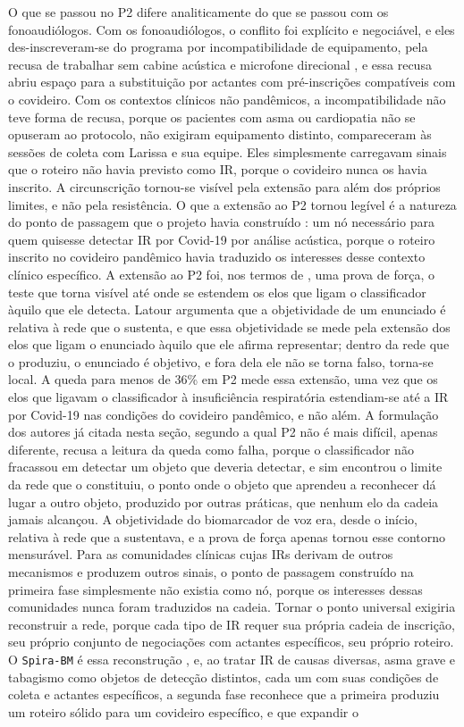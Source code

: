 O que se passou no P2 difere analiticamente do que se passou com os fonoaudiólogos. Com os fonoaudiólogos, o conflito foi explícito e negociável, e eles des-inscreveram-se do programa por incompatibilidade de equipamento, pela recusa de trabalhar sem cabine acústica e microfone direcional \parencite{Akrich1992Description}, e essa recusa abriu espaço para a substituição por actantes com pré-inscrições compatíveis com o covideiro. Com os contextos clínicos não pandêmicos, a incompatibilidade não teve forma de recusa, porque os pacientes com asma ou cardiopatia não se opuseram ao protocolo, não exigiram equipamento distinto, compareceram às sessões de coleta com Larissa e sua equipe. Eles simplesmente carregavam sinais que o roteiro não havia previsto como IR, porque o covideiro nunca os havia inscrito. A circunscrição tornou-se visível pela extensão para além dos próprios limites, e não pela resistência. O que a extensão ao P2 tornou legível é a natureza do ponto de passagem que o projeto havia construído \parencite{Latour2011CienciaEmAcao}: um nó necessário para quem quisesse detectar IR por Covid-19 por análise acústica, porque o roteiro inscrito no covideiro pandêmico havia traduzido os interesses desse contexto clínico específico. A extensão ao P2 foi, nos termos de \textcite{Latour2011CienciaEmAcao}, uma prova de força, o teste que torna visível até onde se estendem os elos que ligam o classificador àquilo que ele detecta. Latour argumenta que a objetividade de um enunciado é relativa à rede que o sustenta, e que essa objetividade se mede pela extensão dos elos que ligam o enunciado àquilo que ele afirma representar; dentro da rede que o produziu, o enunciado é objetivo, e fora dela ele não se torna falso, torna-se local. A queda para menos de 36\% em P2 mede essa extensão, uma vez que os elos que ligavam o classificador à insuficiência respiratória estendiam-se até a IR por Covid-19 nas condições do covideiro pandêmico, e não além. A formulação dos autores já citada nesta seção, segundo a qual P2 não é mais difícil, apenas diferente, recusa a leitura da queda como falha, porque o classificador não fracassou em detectar um objeto que deveria detectar, e sim encontrou o limite da rede que o constituiu, o ponto onde o objeto que aprendeu a reconhecer dá lugar a outro objeto, produzido por outras práticas, que nenhum elo da cadeia jamais alcançou. A objetividade do biomarcador de voz era, desde o início, relativa à rede que a sustentava, e a prova de força apenas tornou esse contorno mensurável. Para as comunidades clínicas cujas IRs derivam de outros mecanismos e produzem outros sinais, o ponto de passagem construído na primeira fase simplesmente não existia como nó, porque os interesses dessas comunidades nunca foram traduzidos na cadeia. Tornar o ponto universal exigiria reconstruir a rede, porque cada tipo de IR requer sua própria cadeia de inscrição, seu próprio conjunto de negociações com actantes específicos, seu próprio roteiro. O \texttt{Spira-BM} é essa reconstrução \parencite{Finger2025SPIRABM}, e, ao tratar IR de causas diversas, asma grave e tabagismo como objetos de detecção distintos, cada um com suas condições de coleta e actantes específicos, a segunda fase reconhece que a primeira produziu um roteiro sólido para um covideiro específico, e que expandir o 